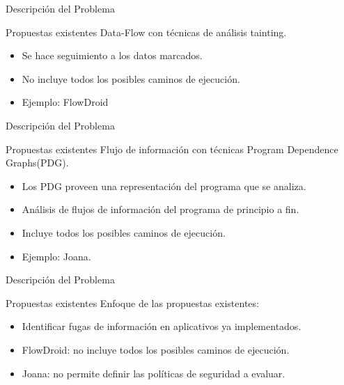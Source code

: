 \begin{frame}{Descripción del Problema}
\begin{block}{Propuestas existentes}
Data-Flow con técnicas de análisis tainting.
\begin{itemize}
	  \item Se hace seguimiento a los datos marcados.
	  \item No incluye todos los posibles caminos de ejecución.
	  \item Ejemplo: FlowDroid
\end{itemize}
\end{block}
\end{frame}
% 
\begin{frame}{Descripción del Problema}
\begin{block}{Propuestas existentes}
Flujo de información con técnicas Program Dependence Graphs(PDG).
\begin{itemize}
 	  \item Los PDG proveen una representación del programa que se analiza.
	  \item Análisis de flujos de información del programa de principio a fin.
	  \item Incluye todos los posibles caminos de ejecución.
	  \item Ejemplo: Joana.
\end{itemize}
\end{block}
\end{frame}

\begin{frame}{Descripción del Problema}
\begin{block}{Propuestas existentes}
Enfoque de las propuestas existentes:
\begin{itemize}
  \item Identificar fugas de información en aplicativos ya implementados.
  \item FlowDroid: no incluye todos los posibles caminos de ejecución.
  \item Joana: no permite definir las políticas de seguridad a evaluar.
\end{itemize}
\end{block}
\end{frame}
% 
% 
% 	
% 
